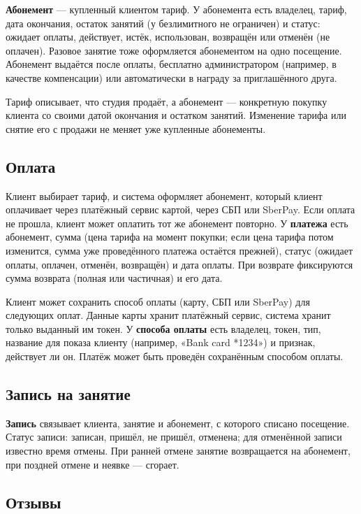 \documentclass[14pt,a4paper]{extarticle}
\begin{document}
\textbf{Абонемент} --- купленный клиентом тариф. У абонемента есть владелец, тариф, дата окончания, остаток занятий (у безлимитного не ограничен) и статус: ожидает оплаты, действует, истёк, использован, возвращён или отменён (не оплачен). Разовое занятие тоже оформляется абонементом на одно посещение. Абонемент выдаётся после оплаты, бесплатно администратором (например, в качестве компенсации) или автоматически в награду за приглашённого друга.

Тариф описывает, что студия продаёт, а абонемент --- конкретную покупку клиента со своими датой окончания и остатком занятий. Изменение тарифа или снятие его с продажи не меняет уже купленные абонементы.

\subsection{Оплата}

Клиент выбирает тариф, и система оформляет абонемент, который клиент оплачивает через платёжный сервис картой, через СБП или SberPay. Если оплата не прошла, клиент может оплатить тот же абонемент повторно. У \textbf{платежа} есть абонемент, сумма (цена тарифа на момент покупки; если цена тарифа потом изменится, сумма уже проведённого платежа остаётся прежней), статус (ожидает оплаты, оплачен, отменён, возвращён) и дата оплаты. При возврате фиксируются сумма возврата (полная или частичная) и его дата.

Клиент может сохранить способ оплаты (карту, СБП или SberPay) для следующих оплат. Данные карты хранит платёжный сервис, система хранит только выданный им токен. У \textbf{способа оплаты} есть владелец, токен, тип, название для показа клиенту (например, «Bank card *1234») и признак, действует ли он. Платёж может быть проведён сохранённым способом оплаты.

\subsection{Запись на занятие}

\textbf{Запись} связывает клиента, занятие и абонемент, с которого списано посещение. Статус записи: записан, пришёл, не пришёл, отменена; для отменённой записи известно время отмены. При ранней отмене занятие возвращается на абонемент, при поздней отмене и неявке --- сгорает.

\subsection{Отзывы}
\end{document}
